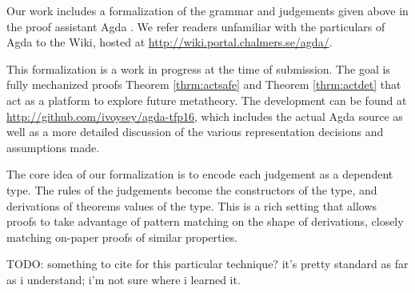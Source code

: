 Our work includes a formalization of the grammar and judgements given above
in the proof assistant Agda \cite{norell:thesis}. We refer readers
unfamiliar with the particulars of Agda to the Wiki, hosted
at \url{http://wiki.portal.chalmers.se/agda/}.

This formalization is a work in progress at the time of submission. The
goal is fully mechanized proofs Theorem \ref{thrm:actsafe} and
Theorem \ref{thrm:actdet} that act as a platform to explore future
metatheory. The development can be found at
\url{http://github.com/ivoysey/agda-tfp16}, which includes the actual Agda
source as well as a more detailed discussion of the various representation
decisions and assumptions made.

The core idea of our formalization is to encode each judgement as a
dependent type. The rules of the judgements become the constructors of the
type, and derivations of theorems values of the type. This is a rich
setting that allows proofs to take advantage of pattern matching on the
shape of derivations, closely matching on-paper proofs of similar
properties.


TODO: something to cite for this particular technique?  it's pretty
standard as far as i understand; i'm not sure where i learned it.


